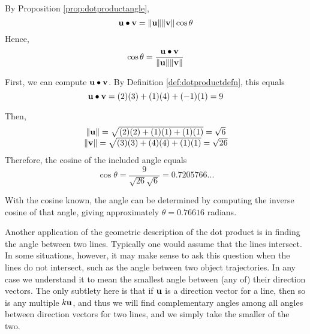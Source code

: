 \begin{solution}
By Proposition \ref{prop:dotproductangle},
\begin{equation*}
\mathbf{u}\bullet \mathbf{v}=\| \mathbf{u}\| \| \mathbf{v}
\| \cos \theta 
\end{equation*}
Hence, 
\begin{equation*}
\cos \theta =\frac{\mathbf{u}\bullet \mathbf{v}}{\| \mathbf{u}\| \| \mathbf{v}
\|}
\end{equation*}
 
First, we can compute $\mathbf{u}\bullet \mathbf{v}$. By Definition \ref{def:dotproductdefn}, this equals
\begin{equation*}
\mathbf{u}\bullet \mathbf{v}
=
(2)(3) + (1)(4)+(-1)(1) = 9
\end{equation*}

Then, 
\begin{equation*}
\begin{array}{c}
\| \mathbf{u} \|
=
\sqrt{(2)(2)+(1)(1)+(1)(1)}=\sqrt{6}\\
\|  \mathbf{v} \|
=
\sqrt{(3)(3)+(4)(4)+(1)(1)}=\sqrt{26}
\end{array}
\end{equation*}
 Therefore, the cosine of the included angle equals
\begin{equation*}
\cos \theta =\frac{9}{\sqrt{26}\sqrt{6}}=0.7205766...
\end{equation*}

With the cosine known, the angle can be determined by computing the
inverse cosine of that angle, giving approximately  $\theta =0.76616$ radians. 
\end{solution}

Another application of the geometric description of the dot product is
in finding the angle between two lines. Typically one would assume that the
lines intersect. In some situations, however, it may make sense to ask this
question when the lines do not intersect, such as the angle between
two object trajectories. In any case we understand it to mean the
smallest angle between (any of) their direction vectors. The only
subtlety here is that if $\mathbf{u}$ is a direction vector for a line,
then so is any multiple $k\mathbf{u}$, and thus we will find complementary angles
among all angles between direction vectors for two lines, and we
simply take the smaller of the two.

